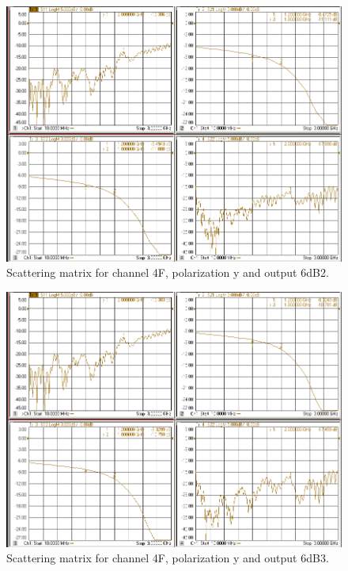 \documentclass[12pt,a4paper,oneside]{article}
\begin{document}
\begin{figure}[H]
\centering
\includegraphics[width=0.9\linewidth]{VNA_results/4Fy_6dB2.png}
\caption{Scattering matrix for channel 4F, polarization y and output 6dB2.}
\label{fig:4Fy_6dB2}
\end{figure}


\begin{figure}[H]
\centering
\includegraphics[width=0.9\linewidth]{VNA_results/4Fy_6dB3.png}
\caption{Scattering matrix for channel 4F, polarization y and output 6dB3.}
\label{fig:4Fy_6dB3}
\end{figure}
\end{document}
